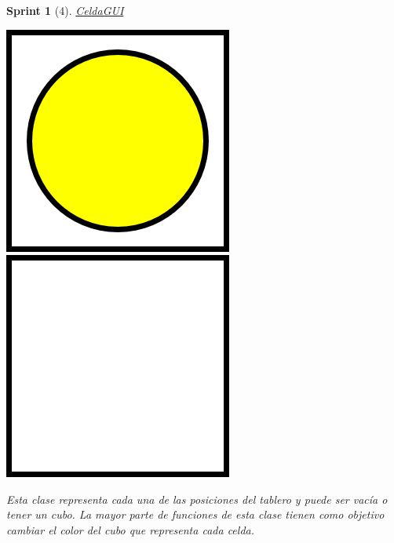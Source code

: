 \documentclass{article}
\theoremstyle{break}
\newtheorem*{sprint}{Sprint}
\begin{document}
\begin{sprint}[4]
\underline{CeldaGUI}
\begin{center}
\includegraphics[scale=0.5]{yellowCube.png}
\includegraphics[scale=0.5]{emptyCell.png}
\end{center}

Esta clase representa cada una de las posiciones del tablero y puede ser vacía o tener un cubo. La mayor parte de funciones de esta clase  tienen como objetivo cambiar el color del cubo que representa cada celda.


\end{sprint}
\end{document}
